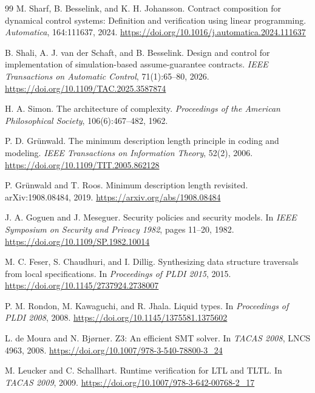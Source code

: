 \begin{thebibliography}{99}
M. Sharf, B. Besselink, and K. H. Johansson.
\newblock Contract composition for dynamical control systems: Definition and
verification using linear programming.
\newblock \emph{Automatica}, 164:111637, 2024.
\newblock \url{https://doi.org/10.1016/j.automatica.2024.111637}

B. Shali, A. J. van der Schaft, and B. Besselink.
\newblock Design and control for implementation of simulation-based assume-guarantee
contracts.
\newblock \emph{IEEE Transactions on Automatic Control}, 71(1):65--80, 2026.
\newblock \url{https://doi.org/10.1109/TAC.2025.3587874}

H. A. Simon.
\newblock The architecture of complexity.
\newblock \emph{Proceedings of the American Philosophical Society}, 106(6):467--482,
1962.

P. D. Gr\"unwald.
\newblock The minimum description length principle in coding and modeling.
\newblock \emph{IEEE Transactions on Information Theory}, 52(2), 2006.
\newblock \url{https://doi.org/10.1109/TIT.2005.862128}

P. Gr\"unwald and T. Roos.
\newblock Minimum description length revisited.
\newblock arXiv:1908.08484, 2019.
\newblock \url{https://arxiv.org/abs/1908.08484}

J. A. Goguen and J. Meseguer.
\newblock Security policies and security models.
\newblock In \emph{IEEE Symposium on Security and Privacy 1982}, pages 11--20, 1982.
\newblock \url{https://doi.org/10.1109/SP.1982.10014}

M. C. Feser, S. Chaudhuri, and I. Dillig.
\newblock Synthesizing data structure traversals from local specifications.
\newblock In \emph{Proceedings of PLDI 2015}, 2015.
\newblock \url{https://doi.org/10.1145/2737924.2738007}

P. M. Rondon, M. Kawaguchi, and R. Jhala.
\newblock Liquid types.
\newblock In \emph{Proceedings of PLDI 2008}, 2008.
\newblock \url{https://doi.org/10.1145/1375581.1375602}

L. de Moura and N. Bj{\o}rner.
\newblock Z3: An efficient SMT solver.
\newblock In \emph{TACAS 2008}, LNCS 4963, 2008.
\newblock \url{https://doi.org/10.1007/978-3-540-78800-3_24}

M. Leucker and C. Schallhart.
\newblock Runtime verification for LTL and TLTL.
\newblock In \emph{TACAS 2009}, 2009.
\newblock \url{https://doi.org/10.1007/978-3-642-00768-2_17}


\end{thebibliography}
